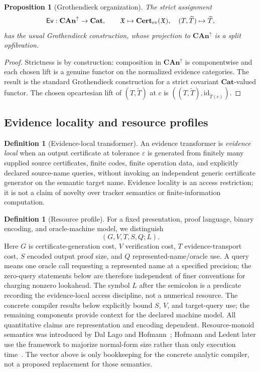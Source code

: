 \documentclass[11pt]{article}
\newtheorem{proposition}[theorem]{Proposition}
\theoremstyle{definition}
\newtheorem{definition}[theorem]{Definition}
\newcommand{\Cert}{\mathbf{Cert}}
\newcommand{\Ev}{\mathsf{Ev}}
\newcommand{\id}{\mathrm{id}}
\begin{document}
\begin{proposition}[Grothendieck organization]\label{prop:opfibration}
The strict assignment
\[
 \Ev:\mathbf{CAn}^{\uparrow}\to\mathbf{Cat},\qquad
 \mathfrak X\mapsto\Cert_{\rm ev}(\mathfrak X),\quad
 (T,\widetilde T)\mapsto\widetilde T,
\]
has the usual Grothendieck construction, whose projection to
$\mathbf{CAn}^{\uparrow}$ is a split opfibration.
\end{proposition}

\begin{proof}
Strictness is by construction: composition in $\mathbf{CAn}^{\uparrow}$ is componentwise and each chosen lift is a genuine functor on the normalized evidence categories.  The result is the standard Grothendieck construction for a strict covariant $\mathbf{Cat}$-valued functor.  The chosen opcartesian lift of
$(T,\widetilde T)$ at $c$ is $((T,\widetilde T),\id_{\widetilde T(c)})$.
\end{proof}

\subsection{Evidence locality and resource profiles}

\begin{definition}[Evidence-local transformer]\label{def:locality}
An evidence transformer is \emph{evidence local} when an output certificate at tolerance
$\varepsilon$ is generated from finitely many supplied source certificates, finite codes,
finite operation data, and explicitly declared source-name queries, without invoking an
independent generic certificate generator on the semantic target name.  Evidence locality
is an access restriction; it is not a claim of novelty over tracker semantics or
finite-information computation.
\end{definition}

\begin{definition}[Resource profile]\label{def:resources}
For a fixed presentation, proof language, binary encoding, and oracle-machine model, we
distinguish
\[
 (G,V,T,S,Q;L).
\]
Here $G$ is certificate-generation cost, $V$ verification cost, $T$ evidence-transport
cost, $S$ encoded output proof size, and $Q$ represented-name/oracle use.  A query means
one oracle call requesting a represented name at a specified precision; the zero-query
statements below are therefore independent of finer conventions for charging nonzero
lookahead.  The symbol $L$ after the semicolon is a predicate recording the evidence-local
access discipline, not a numerical resource.  The concrete compiler results below
explicitly bound $S$, $V$, and target-query use; the remaining components provide context
for the declared machine model.  All quantitative claims are representation and encoding
dependent.  Resource-monoid semantics was introduced by Dal Lago and Hofmann~\cite{DalLagoHofmann};
Hofmann and Ledent later use the framework to majorize normal-form size rather than only
execution time~\cite{HofmannLedent}.  The vector above is only bookkeeping for the concrete
analytic compiler, not a proposed replacement for those semantics.
\end{definition}
\end{document}
